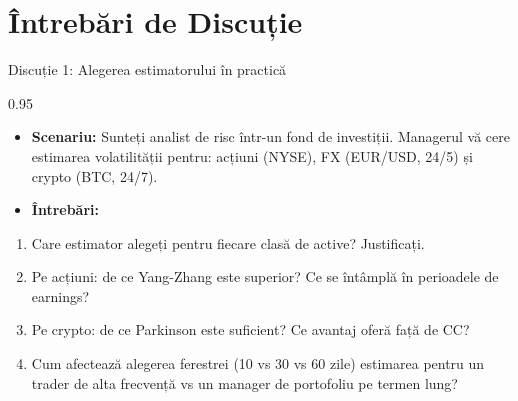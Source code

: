 \documentclass[9pt, aspectratio=169, t]{beamer}
\begin{document}
\section{Întrebări de Discuție}

\begin{frame}[shrink=10]{Discuție 1: Alegerea estimatorului în practică}
\begin{cminipage}{0.95\textwidth}
    \begin{itemize}\setlength{\itemsep}{0pt}
        \item \textbf{Scenariu:} Sunteți analist de risc într-un fond de investiții. Managerul vă cere estimarea volatilității pentru: acțiuni (NYSE), FX (EUR/USD, 24/5) și crypto (BTC, 24/7).
        \item \textbf{Întrebări:}
    \end{itemize}
    \begin{enumerate}\setlength{\itemsep}{0pt}
        \item Care estimator alegeți pentru fiecare clasă de active? Justificați.
        \item Pe acțiuni: de ce Yang-Zhang este superior? Ce se întâmplă în perioadele de earnings?
        \item Pe crypto: de ce Parkinson este suficient? Ce avantaj oferă față de CC?
        \item Cum afectează alegerea ferestrei (10 vs 30 vs 60 zile) estimarea pentru un trader de alta frecvență vs un manager de portofoliu pe termen lung?
    \end{enumerate}
\end{cminipage}
\end{frame}
\end{document}
